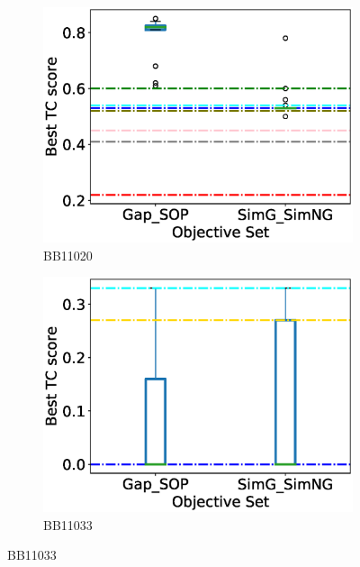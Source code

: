 \begin{figure}[!htbp]
\begin{adjustwidth}{-1cm}{-1cm}
\begin{subfigure}{0.26\textwidth}
			\includegraphics[width=\columnwidth]{Figure/summary/precomputedInit/Balibase/BB11020_objset_tc_rank_2}
			\caption{BB11020}
		\end{subfigure}
		\begin{subfigure}{0.26\textwidth}
			\includegraphics[width=\columnwidth]{Figure/summary/precomputedInit/Balibase/BB11033_objset_tc_rank_2}
			\caption{BB11033}
		\end{subfigure}
		

\end{adjustwidth}
\end{figure}
